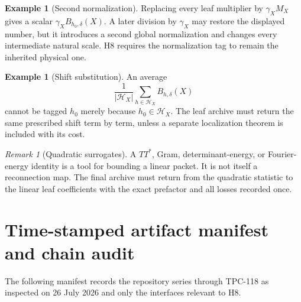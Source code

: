\documentclass[11pt,a4paper]{article}
\theoremstyle{definition}
\newtheorem{example}[theorem]{Example}
\theoremstyle{remark}
\newtheorem{remark}[theorem]{Remark}
\begin{document}
\begin{example}[Second normalization]
Replacing every leaf multiplier by \(\gamma_XM_X\) gives a scalar
\(\gamma_XB_{h_0,\delta}(X)\).  A later division by \(\gamma_X\) may
restore the displayed number, but it introduces a second global
normalization and changes every intermediate natural scale.  H8
requires the normalization tag to remain the inherited physical one.
\end{example}

\begin{example}[Shift substitution]
An average
\[
 \frac1{|\mathcal H_X|}\sum_{h\in\mathcal H_X}
 B_{h,\delta}(X)
\]
cannot be tagged \(h_0\) merely because \(h_0\in\mathcal H_X\).  The
leaf archive must return the same prescribed shift term by term, unless
a separate localization theorem is included with its cost.
\end{example}

\begin{remark}[Quadratic surrogates]
A \(TT^*\), Gram, determinant-energy, or Fourier-energy identity is a
tool for bounding a linear packet.  It is not itself a reconnection
map.  The final archive must return from the quadratic statistic to the
linear leaf coefficients with the exact prefactor and all losses
recorded once.
\end{remark}

\section{Time-stamped artifact manifest and chain audit}

The following manifest records the repository series through TPC-118
as inspected on 26 July 2026 and only the interfaces relevant to H8.
\end{document}
